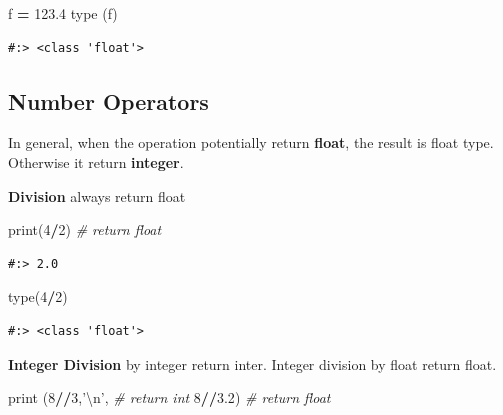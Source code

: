 \documentclass[
]{book}
\newenvironment{Shaded}{\begin{snugshade}}{\end{snugshade}}
\newcommand{\BuiltInTok}[1]{#1}
\newcommand{\CharTok}[1]{\textcolor[rgb]{0.5,0.5,0.5}{#1}}
\newcommand{\CommentTok}[1]{\textcolor[rgb]{0.37,0.37,0.37}{\textit{#1}}}
\newcommand{\DecValTok}[1]{\textcolor[rgb]{0.06,0.06,0.06}{#1}}
\newcommand{\FloatTok}[1]{\textcolor[rgb]{0.06,0.06,0.06}{#1}}
\newcommand{\NormalTok}[1]{#1}
\newcommand{\OperatorTok}[1]{\textcolor[rgb]{0.43,0.43,0.43}{\textbf{#1}}}
\newcommand{\StringTok}[1]{\textcolor[rgb]{0.5,0.5,0.5}{#1}}
\begin{document}
\begin{Shaded}
\begin{Highlighting}[]
\NormalTok{f }\OperatorTok{=} \FloatTok{123.4}
\BuiltInTok{type}\NormalTok{ (f)}
\end{Highlighting}
\end{Shaded}

\begin{verbatim}
#:> <class 'float'>
\end{verbatim}

\hypertarget{number-operators}{%
\subsection{Number Operators}\label{number-operators}}

In general, when the operation potentially return \textbf{float}, the result is float type. Otherwise it return \textbf{integer}.

\textbf{Division} always return float

\begin{Shaded}
\begin{Highlighting}[]
\BuiltInTok{print}\NormalTok{(}\DecValTok{4}\OperatorTok{/}\DecValTok{2}\NormalTok{)  }\CommentTok{# return float}
\end{Highlighting}
\end{Shaded}

\begin{verbatim}
#:> 2.0
\end{verbatim}

\begin{Shaded}
\begin{Highlighting}[]
\BuiltInTok{type}\NormalTok{(}\DecValTok{4}\OperatorTok{/}\DecValTok{2}\NormalTok{)}
\end{Highlighting}
\end{Shaded}

\begin{verbatim}
#:> <class 'float'>
\end{verbatim}

\textbf{Integer Division} by integer return inter. Integer division by float return float.

\begin{Shaded}
\begin{Highlighting}[]
\BuiltInTok{print}\NormalTok{ (}\DecValTok{8}\OperatorTok{//}\DecValTok{3}\NormalTok{,}\StringTok{'}\CharTok{\textbackslash{}n}\StringTok{'}\NormalTok{,    }\CommentTok{# return int}
       \DecValTok{8}\OperatorTok{//}\FloatTok{3.2}\NormalTok{)       }\CommentTok{# return float}
\end{Highlighting}
\end{Shaded}
\end{document}
